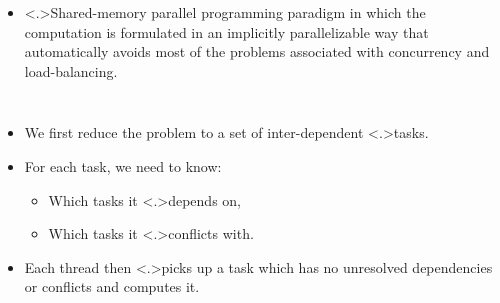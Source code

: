 \documentclass{beamer}
\begin{document}
    \begin{frame}
        \begin{itemize}
        
        \pause

        \item<+-> \alert<.>{Shared-memory parallel programming paradigm}
            in which the computation is formulated in an
            \alert<+>{implicitly parallelizable} way that
            automatically avoids most of the problems associated
            with \alert<+>{concurrency and load-balancing}.
            
        \end{itemize}
        
        \vspace{-1.5ex}
                
        \begin{columns}
        
            \begin{itemize}
            
                \item<+-> We first reduce the problem to a set of inter-dependent
                    \alert<.>{tasks}.

                \item<+-> For each task, we need to know:
                    
                    \begin{itemize}
                        \item<+-> Which tasks it \alert<.>{depends} on,
                        \item<+-> Which tasks it \alert<.>{conflicts} with.
                    \end{itemize}
                    
                \item<+-> Each thread then \alert<.>{picks up a task} which
                    has no unresolved dependencies or conflicts and computes it.
                    
            \end{itemize}
            
            

\end{columns}
\end{frame}
\end{document}
